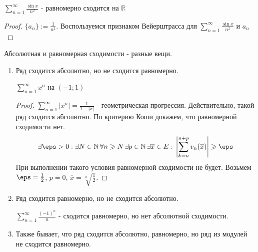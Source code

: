 \begin{example} \thmslashn

  $\sum\limits_{n = 1}^{\infty}{\frac{\sin{x}}{n^2}}$ - равномерно сходится на $\mathbb{R}$
  \begin{proof} \thmslashn

    $\{a_n\} := \frac{1}{n^2}$. Воспользуемся признаком Вейерштрасса для $\sum\limits_{n = 1}^{\infty}{\frac{\sin{x}}{n^2}} \text{ и } a_n$
  \end{proof}
\end{example}

\begin{remark} \thmslashn

  Абсолютная и равномерная сходимости - разные вещи.

  \begin{enumerate}
  \item
    Ряд сходится абсолютно, но не сходится равномерно.
    \begin{example} \thmslashn

      $\sum\limits_{n = 1}^{\infty}{x^n}$ на $(-1; 1)$
      \begin{proof} \thmslashn

        $\sum\limits_{n = 1}^{\infty}{|x^{n}|} = \frac{1}{1 - |x|}$  - геометрическая прогрессия. Действительно, такой ряд сходится абсолютно. По критерию Коши докажем, что равномерной сходимости нет.
        \[\begin{aligned}
          \exists \eps > 0 : \exists N \in \mathbb{N}\, \forall n \geqslant N \,\exists p \in \mathbb{N} \,\exists \overline{x} \in E: \,\left|\sum\limits_{k = n}^{n+p}{v_n(\overline{x})}\right| \geqslant \eps
        \end{aligned}\]
        При выполнении такого условия равномерной сходимости не будет. Возьмем $\eps = \frac{1}{2}$, $p = 0$, $\overline{x} = \sqrt[n]{\frac{1}{2}}$.
      \end{proof}
    \end{example}
  \item
    Ряд сходится равномерно, но не сходится абсолютно.
    \begin{example} \thmslashn

      $\sum\limits_{n = 1}^{\infty}{\frac{(-1)^n}{n}}$ - сходится равномерно, но нет абсолютной сходимости.
    \end{example}
  \item
    Также бывает, что ряд сходится абсолютно, равномерно, но ряд из модулей не сходится равномерно.
  \end{enumerate}
\end{remark}


